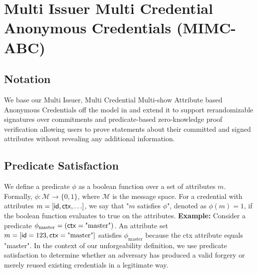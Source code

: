 



\newpage
\section{Multi Issuer Multi Credential Anonymous Credentials (MIMC-ABC)}\label{sec:mimc}


\subsection{Notation}
We base our Multi Issuer, Multi Credential Multi-show Attribute based Anonymous Credentials off the model in \cite{fuchsbauer_structure-preserving_2019} and extend it to support rerandomizable signatures over commitments and predicate-based zero-knowledge proof verification allowing users to prove statements about their committed and signed attributes without revealing any additional information.

\subsection{Predicate Satisfaction}

We define a predicate $\phi$ as a boolean function over a set of attributes $m$. Formally, $\phi: \mathcal{M} \rightarrow \{0,1\}$, where $\mathcal{M}$ is the message space.
For a credential with attributes $m = [\mathsf{id}, \mathsf{ctx}, \ldots]$, we say that "$m$ satisfies $\phi$", denoted as $\phi(m) = 1$, if the boolean function evaluates to true on the attributes.
\textbf{Example:} Consider a predicate $\phi_{\text{master}} = (\mathsf{ctx} = \text{"master"})$. An attribute set $m = [\mathsf{id}=123, \mathsf{ctx}=\text{"master"}]$ satisfies $\phi_{\text{master}}$ because the ctx attribute equals "master".
In the context of our unforgeability definition, we use predicate satisfaction to determine whether an adversary has produced a valid forgery or merely reused existing credentials in a legitimate way.

